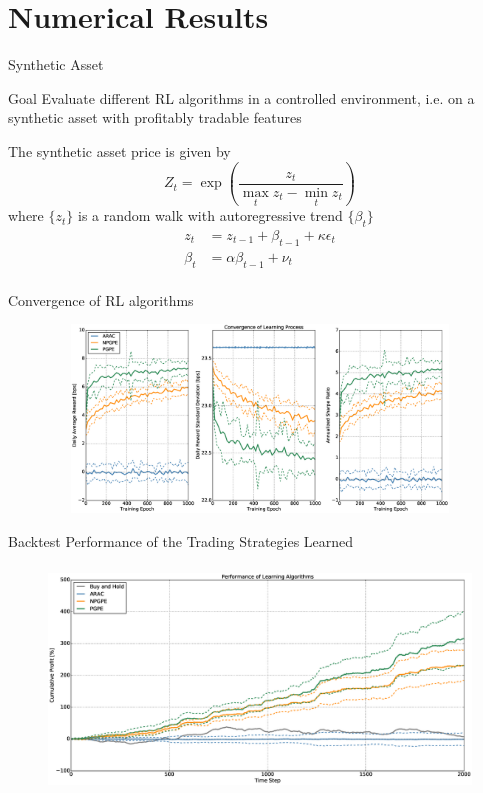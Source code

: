 \section{Numerical Results}
\label{sec:numerical_results}

\begin{frame}[c]{Synthetic Asset}
	\begin{block}{Goal}
		Evaluate different RL algorithms in a controlled environment, i.e.  on a synthetic asset with profitably tradable features 
	\end{block}
	The synthetic asset price is given by
	\begin{equation*}
		Z_t = \exp\left(\frac{z_t}{\max_t z_t - \min_t z_t}\right)
	\end{equation*}
	where $\{z_t\}$ is a random walk with autoregressive trend $\{\beta_t\}$
		\begin{equation*}
			\begin{split}
				z_t &= z_{t-1} + \beta_{t-1} + \kappa \epsilon_t\\
				\beta_t &= \alpha \beta_{t-1} + \nu_t\\
			\end{split}
		\end{equation*}
\end{frame}

\begin{frame}[c]{Convergence of RL algorithms}
\begin{figure}[t!]
	\centering
	\includegraphics[height=5cm,width=1.0\textwidth]{Images/6_0_single_synthetic_neutral_convergence}
\end{figure}
\end{frame}


\begin{frame}[c]{Backtest Performance of the Trading Strategies Learned}
\begin{figure}[t]
	\centering
	\includegraphics[height=6cm,width=1.0\textwidth]{Images/6_1_single_synthetic_neutral_performance}
\end{figure}
\end{frame}

